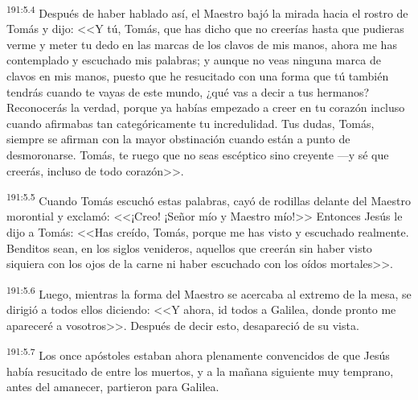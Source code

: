 \par 
\textsuperscript{191:5.4} Después de haber hablado así, el Maestro bajó la mirada hacia el rostro de Tomás y dijo: <<Y tú, Tomás, que has dicho que no creerías hasta que pudieras verme y meter tu dedo en las marcas de los clavos de mis manos, ahora me has contemplado y escuchado mis palabras; y aunque no veas ninguna marca de clavos en mis manos, puesto que he resucitado con una forma que tú también tendrás cuando te vayas de este mundo, ¿qué vas a decir a tus hermanos? Reconocerás la verdad, porque ya habías empezado a creer en tu corazón incluso cuando afirmabas tan categóricamente tu incredulidad. Tus dudas, Tomás, siempre se afirman con la mayor obstinación cuando están a punto de desmoronarse. Tomás, te ruego que no seas escéptico sino creyente ---y sé que creerás, incluso de todo corazón>>.

\par 
\textsuperscript{191:5.5} Cuando Tomás escuchó estas palabras, cayó de rodillas delante del Maestro morontial y exclamó: <<¡Creo! ¡Señor mío y Maestro mío!>> Entonces Jesús le dijo a Tomás: <<Has creído, Tomás, porque me has visto y escuchado realmente. Benditos sean, en los siglos venideros, aquellos que creerán sin haber visto siquiera con los ojos de la carne ni haber escuchado con los oídos mortales>>.

\par 
\textsuperscript{191:5.6} Luego, mientras la forma del Maestro se acercaba al extremo de la mesa, se dirigió a todos ellos diciendo: <<Y ahora, id todos a Galilea, donde pronto me apareceré a vosotros>>. Después de decir esto, desapareció de su vista.

\par 
\textsuperscript{191:5.7} Los once apóstoles estaban ahora plenamente convencidos de que Jesús había resucitado de entre los muertos, y a la mañana siguiente muy temprano, antes del amanecer, partieron para Galilea.

